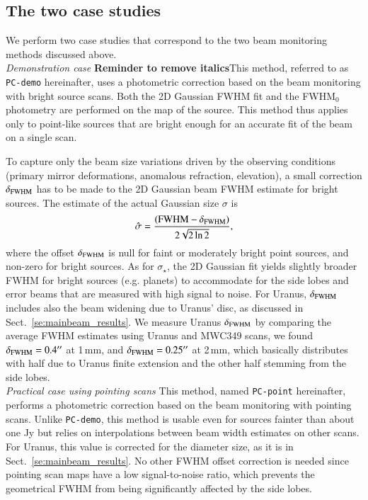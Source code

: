 \documentclass[traditionalabstract]{aa}
\newcommand{\nico}[1]{#1}
\newcommand{\LEt}[1]{{\bf {\color[RGB]{0, 153, 255} #1}}}
\begin{document}
{\begin{appendix}
\subsection{The two case studies}

We perform two case studies that correspond to the two beam monitoring
methods discussed above.\\

\noindent \emph{Demonstration case} \LEt{Reminder to remove italics}This method, referred to as {\tt PC-demo} hereinafter, uses a
photometric correction based on the beam monitoring with bright source
scans. Both the 2D Gaussian FWHM fit and the FWHM$_0$ photometry are performed
on the map of the source. This method thus applies only to point-like sources
that are bright enough for an accurate fit of the beam on a single scan.

To capture only the beam size variations driven by the
observing conditions (primary mirror deformations, anomalous
refraction, elevation), a small correction $\delta_{\rm{FWHM}}$ has to be made to
the 2D Gaussian beam FWHM estimate for bright sources. The estimate of the
actual Gaussian size $\sigma$ is
\begin{equation}
  \hat{\sigma} = \frac{(\rm{FWHM} - \delta_{\rm{FWHM}})}{2\sqrt{2 \ln{2}}}, 
\end{equation} 
where the offset $\delta_{\rm{FWHM}}$ is null for faint or moderately
bright point sources, and non-zero for bright sources.
As for $\sigma_\star$, the 2D Gaussian fit yields slightly broader
FWHM for bright sources (e.g. planets) to accommodate
for the side lobes and error beams that are measured with high signal to noise.
For Uranus, $\delta_{\rm{FWHM}}$ includes also the beam widening due
to Uranus' disc, as discussed in Sect.~\ref{se:mainbeam_results}.
We measure Uranus $\delta_{\rm{FWHM}}$
by comparing the average %
FWHM estimates using Uranus
and MWC349 scans, we found $\delta_{\rm{FWHM}} = 0.4''$ at
1\,mm, and $\delta_{\rm{FWHM}} = 0.25''$ at 2\,mm, which basically
distributes with half due to Uranus finite extension and the
other half stemming from the side lobes.\\

\noindent \emph{Practical case using pointing scans} This method,
named {\tt PC-point} hereinafter, performs a photometric correction based on the beam monitoring with
pointing scans. 
Unlike {\tt PC-demo}, this method is usable even for sources fainter than
about one Jy \nico{but relies on interpolations between beam width estimates on
  other scans}. For Uranus, this value is corrected for the diameter size, as it is in
Sect.~\ref{se:mainbeam_results}. No other FWHM offset correction is needed since
pointing scan maps have a low signal-to-noise ratio, which prevents the
geometrical FWHM from being significantly affected by the side lobes.



\end{appendix}}
\end{document}
